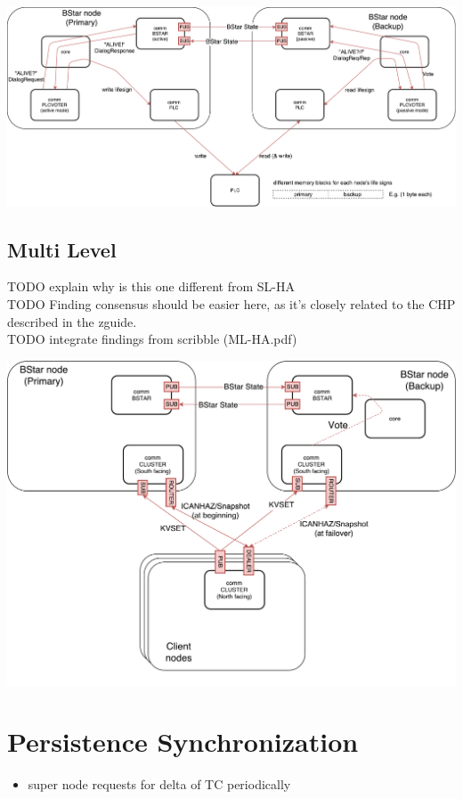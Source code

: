 \includegraphics[width=\textwidth]{img/SL-HA_bstar.pdf}

\subsection{Multi Level}
TODO explain why is this one different from SL-HA\\
TODO Finding consensus should be easier here, as it's closely related to the CHP described in the zguide.\\
TODO integrate findings from scribble (ML-HA.pdf)

\includegraphics[width=\textwidth]{img/ML-HA_bstar.pdf}

\section{Persistence Synchronization}\label{sec:meth:psync}
\begin{itemize}
	\item super node requests for delta of TC periodically
\end{itemize}

